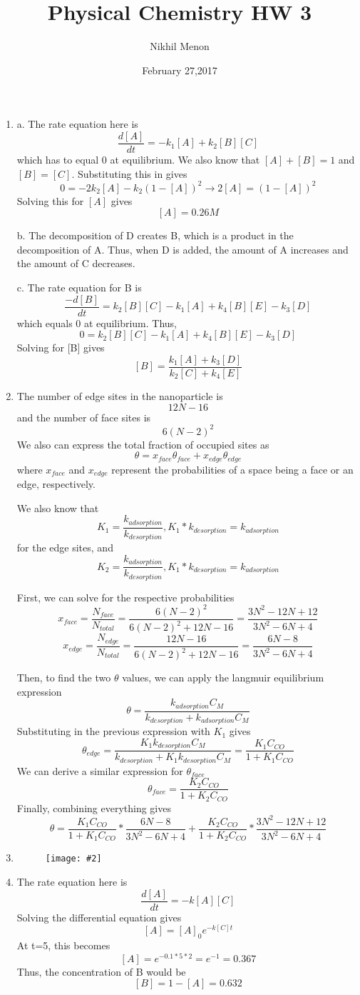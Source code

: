\documentclass{article}
\title{Physical Chemistry HW 3}
\author{Nikhil Menon}
\date{February 27,2017}
\newcommand{\makefig}[2]{
\begin{figure}[h!]
\centering
\texttt{[image: \#2]}
\end{figure}
}
\begin{document}
\maketitle
\begin{enumerate}
\item  

a. The rate equation here is
$$\frac{d[A]}{dt}=-k_1[A]+k_2[B][C]$$
which has to equal 0 at equilibrium. We also know that $[A]+[B]=1$ and $[B]=[C]$.
Substituting this in gives
$$0=-2k_2[A]-k_2(1-[A])^2\rightarrow 2[A]=(1-[A])^2$$
Solving this for $[A]$ gives
$$[A]=0.26 M$$

b. The decomposition of D creates B, which is a product in the decomposition of A. Thus, when D is added, the amount of A increases and the amount of C decreases.

c. The rate equation for B is
$$\frac{-d[B]}{dt}=k_2[B][C]-k_1[A]+k_4[B][E]-k_3[D]$$
which equals 0 at equilibrium. Thus,
$$0=k_2[B][C]-k_1[A]+k_4[B][E]-k_3[D]$$
Solving for [B] gives
$$[B]=\frac{k_1[A]+k_3[D]}{k_2[C]+k_4[E]}$$

\item
The number of edge sites in the nanoparticle is
$$12N-16$$
and the number of face sites is 
$$6(N-2)^2$$
We also can express the total fraction of occupied sites as
$$\theta = x_{face}\theta_{face}+x_{edge}\theta_{edge}$$
where $x_{face}$ and $x_{edge}$ represent the probabilities of a space being a face or an edge, respectively.

We also know that
$$K_1=\frac{k_{adsorption}}{k_{desorption}},K_1*k_{desorption}=k_{adsorption}$$
for the edge sites, and
$$K_2=\frac{k_{adsorption}}{k_{desorption}},K_1*k_{desorption}=k_{adsorption}$$

First, we can solve for the respective probabilities
$$x_{face}=\frac{N_{face}}{N_{total}}=\frac{6(N-2)^2}{6(N-2)^2+12N-16}=\frac{3N^2-12N+12}{3N^2-6N+4}$$
$$x_{edge}=\frac{N_{edge}}{N_{total}}=\frac{12N-16}{6(N-2)^2+12N-16}=\frac{6N-8}{3N^2-6N+4}$$

Then, to find the two $\theta$ values, we can apply the langmuir equilibrium expression
$$\theta=\frac{k_{adsorption}C_M}{k_{desorption}+k_{adsorption}C_M}$$
Substituting in the previous expression with $K_1$ gives
$$\theta_{edge}=\frac{K_1k_{desorption}C_M}{k_{desorption}+K_1k_{desorption}C_M}=\frac{K_1C_{CO}}{1+K_1C_{CO}}$$
We can derive a similar expression for $\theta_{face}$
$$\theta_{face}=\frac{K_2C_{CO}}{1+K_2C_{CO}}$$
Finally, combining everything gives
$$\theta =\frac{K_1C_{CO}}{1+K_1C_{CO}}*\frac{6N-8}{3N^2-6N+4}+\frac{K_2C_{CO}}{1+K_2C_{CO}}*\frac{3N^2-12N+12}{3N^2-6N+4}$$

\item
\makefig{0.6}{P3.png}

\item
The rate equation here is
$$\frac{d[A]}{dt}=-k[A][C]$$
Solving the differential equation gives
$$[A]=[A]_0e^{-k[C]t}$$
At t=5, this becomes
$$[A]=e^{-0.1*5*2}=e^{-1}=0.367$$
Thus, the concentration of B would be
$$[B]=1-[A]=0.632$$

\end{enumerate}
\end{document}
